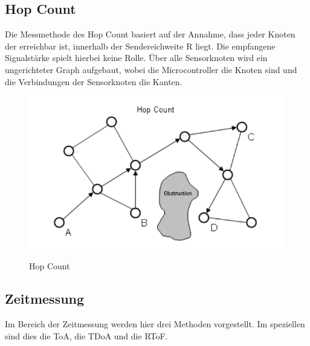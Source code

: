 \subsection{Hop Count}
Die Messmethode des Hop Count basiert auf der Annahme, dass jeder Knoten der erreichbar ist, innerhalb der Sendereichweite R liegt. Die empfangene
Signalstärke spielt hierbei keine Rolle. Über alle Sensorknoten wird ein ungerichteter Graph aufgebaut, wobei die Microcontroller die Knoten sind und die Verbindungen der Sensorknoten die Kanten.
\begin{figure}
  \caption{Hop Count}
  \includegraphics[scale=0.75]{img/hop_count1}\\
\end{figure}

\subsection{Zeitmessung}
Im Bereich der Zeitmessung werden hier drei Methoden vorgestellt. Im speziellen sind dies die \ac{ToA}, die \ac{TDoA} und die \ac{RToF}.
